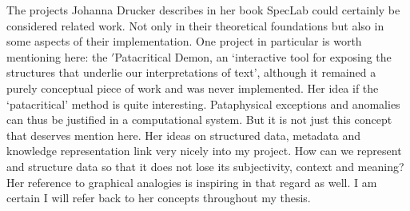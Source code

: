 The projects Johanna Drucker describes in her book SpecLab \autocite{Drucker2009}  could certainly be considered related work. Not only in their theoretical foundations but also in some aspects of their implementation. One project in particular is worth mentioning here: the $'$Patacritical Demon, an `interactive tool for exposing the structures that underlie our interpretations of text', although it remained a purely conceptual piece of work and was never implemented. Her idea if the `patacritical' method is quite interesting. Pataphysical exceptions and anomalies can thus be justified in a computational system. But it is not just this concept that deserves mention here.
Her ideas on structured data, metadata and knowledge representation link very nicely into my project. How can we represent and structure data so that it does not lose its subjectivity, context and meaning? Her reference to graphical analogies is inspiring in that regard as well. I am certain I will refer back to her concepts throughout my thesis.


